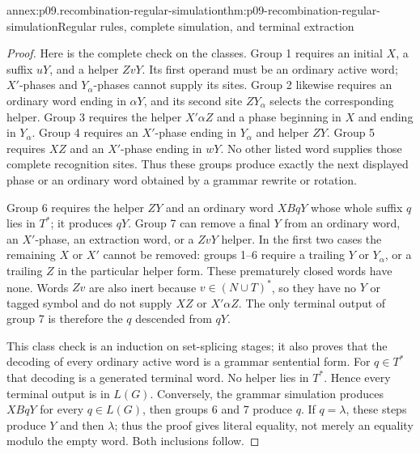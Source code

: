 \begin{annexitem}{annex:p09.recombination-regular-simulation}{thm:p09-recombination-regular-simulation}{Regular rules, complete simulation, and terminal extraction}
\begin{proof}
Here is the complete check on the classes. Group 1 requires an initial
\(X\), a suffix \(uY\), and a helper \(ZvY\). Its first operand must
be an ordinary active word; \(X'\)-phases and \(Y_\alpha\)-phases
cannot supply its sites. Group 2 likewise requires an ordinary word
ending in \(\alpha Y\), and its second site \(ZY_\alpha\) selects
the corresponding helper. Group 3 requires the helper \(X'\alpha Z\)
and a phase beginning in \(X\) and ending in \(Y_\alpha\).
Group 4 requires an \(X'\)-phase ending in \(Y_\alpha\) and helper
\(ZY\). Group 5 requires \(XZ\) and an \(X'\)-phase ending in
\(wY\). No other listed word supplies those complete recognition sites.
Thus these groups produce exactly the next displayed phase or an ordinary
word obtained by a grammar rewrite or rotation.

Group 6 requires the helper \(ZY\) and an ordinary word \(XBqY\)
whose whole suffix \(q\) lies in \(T^*\); it produces \(qY\).
Group 7 can remove a final \(Y\) from an ordinary word, an \(X'\)-phase,
an extraction word, or a \(ZvY\) helper. In the first two cases the
remaining \(X\) or \(X'\) cannot be removed: groups 1--6 require a
trailing \(Y\) or \(Y_\alpha\), or a trailing \(Z\) in the particular
helper form. These prematurely closed words have none. Words \(Zv\)
are also inert because \(v\in(N\cup T)^*\), so they have no \(Y\)
or tagged symbol and do not supply \(XZ\) or \(X'\alpha Z\).
The only terminal output of group 7 is therefore the \(q\) descended
from \(qY\).

This class check is an induction on set-splicing stages; it also proves
that the decoding of every ordinary active word is a grammar sentential
form. For \(q\in T^*\) that decoding is a generated terminal word.
No helper lies in \(T^*\). Hence every terminal output is in \(L(G)\).
Conversely, the grammar simulation produces \(XBqY\) for every
\(q\in L(G)\), then groups 6 and 7 produce \(q\).
If \(q=\lambda\), these steps produce \(Y\) and then \(\lambda\);
thus the proof gives literal equality, not merely an equality modulo the
empty word. Both inclusions follow.
\end{proof}
\end{annexitem}


